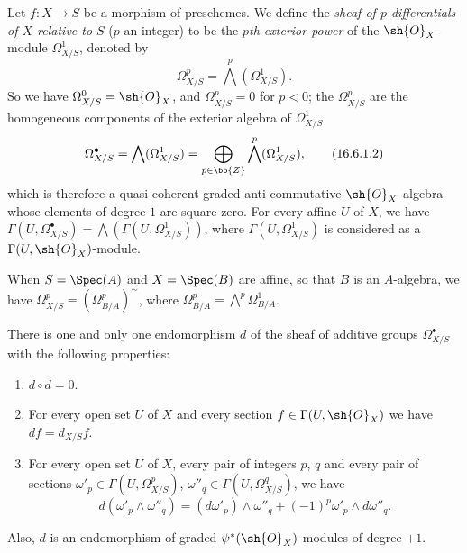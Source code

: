 \begin{env}[16.6.1]
\label{IV.16.6.1}
Let $f:X \to S$ be a morphism of preschemes.
We define the \emph{sheaf of $p$-differentials of $X$ relative to $S$} ($p$ an integer) to be the \emph{$p$th exterior power}  of the $\sh{O}_X$-module $\Omega_{X/S}^1$, denoted by
\[
  \label{IV.16.6.1.1}
  \Omega_{X/S}^p = \bigwedge^p(\Omega_{X/S}^1).
  \tag{16.6.1.1}
\] 
So we have $\Omega_{X/S}^0 = \sh{O}_X$, and $\Omega_{X/S}^p = 0$ for $p < 0$;
the $\Omega_{X/S}^p$ are the homogeneous components of the exterior algebra of $\Omega_{X/S}^1$
\[  
  \label{IV.16.6.1.2}
  \Omega_{X/S}^\bullet = \bigwedge(\Omega_{X/S}^1) = \bigoplus_{p \in \bb{Z}}\bigwedge^p(\Omega_{X/S}^1),  
  \tag{16.6.1.2}
\] 
which is therefore a quasi-coherent graded anti-commutative $\sh{O}_X$-algebra whose elements of degree $1$ are square-zero.
For every affine $U$ of $X$, we have $\Gamma(U, \Omega_{X/S}^\bullet) = \bigwedge (\Gamma(U, \Omega_{X/S}^1))$, where $\Gamma(U, \Omega_{X/S}^1)$ is considered as a $\Gamma(U, \sh{O}_X)$-module.

When $S = \Spec(A)$ and $X = \Spec(B)$ are affine, so that $B$ is an $A$-algebra, we have  $\Omega_{X/S}^p = (\Omega_{B/A}^p)^\sim$, where $\Omega_{B/A}^p = \bigwedge^p\Omega^1_{B/A}$. 
\end{env}

\begin{theorem}[16.6.2]
\label{IV.16.6.2}
There is one and only one endomorphism $d$ of the sheaf of additive groups $\Omega_{X/S}^\bullet$ with the following properties:
\begin{enumerate}
  \item[\rm{(i)}] $d \circ d = 0$.
  \item[\rm{(ii)}] For every open set $U$ of $X$ and every section $f \in \Gamma(U, \sh{O}_X)$ we have $df = d_{X/S}f$. 
  \item[\rm{(iii)}] For every open set $U$ of $X$, every pair of integers $p$, $q$ and every pair of sections $\omega'_p \in \Gamma(U, \Omega_{X/S}^p)$, $\omega''_q \in \Gamma(U, \Omega_{X/S}^q)$, we have
  \[
    \label{IV.16.6.2.1}
    d(\omega'_p \wedge \omega''_q) = (d\omega'_p) \wedge \omega''_q + (-1)^p \omega'_p \wedge d\omega''_q.
    \tag{16.6.2.1}
  \]
\end{enumerate}
Also, $d$ is an endomorphism of graded $\psi^*(\sh{O}_X)$-modules of degree $+1$.
\end{theorem}

